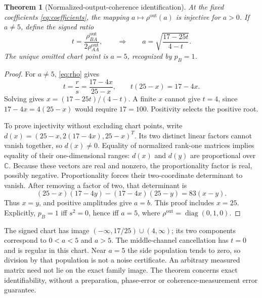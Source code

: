 \documentclass[11pt,a4paper]{article}
\newtheorem{theorem}[proposition]{Theorem}
\newcommand{\C}{\mathbb C}
\newcommand{\rout}{\rho^{\mathrm{out}}}
\newcommand{\diag}{\operatorname{diag}}
\begin{document}
\begin{theorem}[Normalized-output-coherence identification]\label{thm:rho}
At the fixed coefficients \eqref{eq:coefficients}, the mapping $a\mapsto\rout(a)$ is injective for $a>0$. If $a\ne5$, define the signed ratio
\begin{equation}
t=\frac{\rout_{BA}}{2\rout_{AA}},
\qquad\Longrightarrow\qquad
\boxed{a=\sqrt{\frac{17-25t}{4-t}}}.\label{eq:rhoinverse}
\end{equation}
The unique omitted chart point is $a=5$, recognized by $p_B=1$.
\end{theorem}
\begin{proof}
For $a\ne5$, \eqref{eq:rho} gives
\begin{equation}
t=\frac{r}{s}=\frac{17-4x}{25-x},\qquad
t(25-x)=17-4x.
\end{equation}
Solving gives $x=(17-25t)/(4-t)$. A finite $x$ cannot give $t=4$, since $17-4x=4(25-x)$ would require $17=100$. Positivity selects the positive root.

To prove injectivity without excluding chart points, write
$d(x)=(25-x,2(17-4x),25-x)^T$. Its two distinct linear factors cannot vanish together, so $d(x)\ne0$. Equality of normalized rank-one matrices implies equality of their one-dimensional ranges: $d(x)$ and $d(y)$ are proportional over $\C$. Because these vectors are real and nonzero, the proportionality factor is real, possibly negative. Proportionality forces their two-coordinate determinant to vanish. After removing a factor of two, that determinant is
\begin{equation}
(25-x)(17-4y)-(17-4x)(25-y)=83(x-y).\label{eq:determinant}
\end{equation}
Thus $x=y$, and positive amplitudes give $a=b$. This proof includes $x=25$. Explicitly, $p_B=1$ iff $s^2=0$, hence iff $a=5$, where $\rout=\diag(0,1,0)$.
\end{proof}

The signed chart has image $(-\infty,17/25)\cup(4,\infty)$; its two components correspond to $0<a<5$ and $a>5$. The middle-channel cancellation has $t=0$ and is regular in this chart. Near $a=5$ the side population tends to zero, so division by that population is not a noise certificate. An arbitrary measured matrix need not lie on the exact family image. The theorem concerns exact identifiability, without a preparation, phase-error or coherence-measurement error guarantee.

\clearpage
\end{document}
